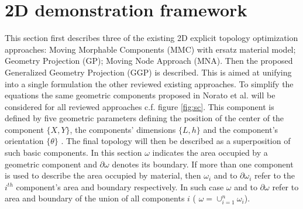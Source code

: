 \section{2D demonstration framework}
\label{Sec3.1}
This section first describes three of the existing 2D explicit topology optimization approaches: Moving Morphable Components (MMC) with ersatz material model; Geometry Projection (GP); Moving Node Approach (MNA). Then the proposed Generalized Geometry Projection (GGP) is described. This is aimed at unifying into a single formulation the other reviewed existing approaches. 
To simplify the equations the same geometric components proposed in Norato et al. \cite{norato2015geometry} will be considered for all reviewed approaches c.f. figure \ref{fig:sc}. This component is defined by five geometric parameters defining the position of the center of the component $\lbrace X,Y\rbrace$, the components' dimensions $\lbrace L,h \rbrace$  and the component's orientation $\lbrace \theta \rbrace$ . The final topology will then be described as a superposition of such basic components. 
In this section $\omega$ indicates the area occupied by a geometric component and $\partial \omega$ denotes its boundary. If more than one component is used to describe the area occupied by material, then $\omega_i$ and to $\partial \omega_i$ refer to the $i^{th}$ component's area and boundary respectively. In such case $\omega$ and to $\partial \omega$ refer to area and boundary of the union of all components $i$ ( $\omega=\cup_{i=1}^n{\omega_i}$). 
